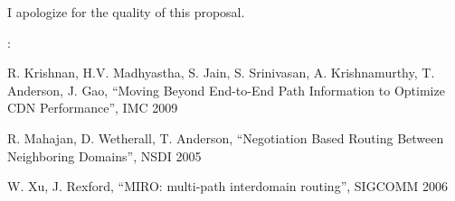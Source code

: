 \documentclass[12pt]{article}	%
\newenvironment{packed_enum}{
\begin{enumerate}
  \setlength{\itemsep}{1pt}
  \setlength{\parskip}{0pt}
  \setlength{\parsep}{0pt}
}{\end{enumerate}}
\begin{document}
 I apologize for the quality of this proposal.
%
%

: 
\begin{packed_enum}
\item R. Krishnan, H.V. Madhyastha, S. Jain, S. Srinivasan, A.
Krishnamurthy, T. Anderson, J. Gao, ``Moving Beyond End-to-End Path
Information to Optimize CDN Performance'', IMC 2009
\item R. Mahajan, D. Wetherall, T. Anderson, ``Negotiation Based Routing
Between Neighboring Domains'', NSDI 2005
\item W. Xu, J. Rexford, ``MIRO: multi-path interdomain routing'', SIGCOMM
2006
\end{packed_enum}
\end{document}
